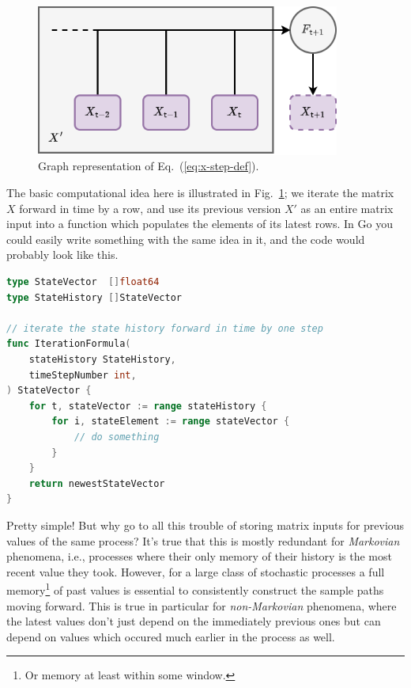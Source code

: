 \documentclass{book}
\begin{document}
\begin{figure}[h]
\centering
\includegraphics[width=10cm]{images/fundamental-loop.drawio.png}
\caption{Graph representation of Eq.~(\ref{eq:x-step-def}).}
\label{fig:fundamental-loop}
\end{figure}

The basic computational idea here is illustrated in Fig.~\ref{fig:fundamental-loop}; we iterate the matrix $X$ forward in time by a row, and use its previous version $X'$ as an entire matrix input into a function which populates the elements of its latest rows. In Go you could easily write something with the same idea in it, and the code would probably look like this.

\begin{lstlisting}[language=Go]
type StateVector  []float64
type StateHistory []StateVector

// iterate the state history forward in time by one step
func IterationFormula(
    stateHistory StateHistory, 
    timeStepNumber int,
) StateVector {
    for t, stateVector := range stateHistory {
        for i, stateElement := range stateVector {
            // do something
        }
    }
    return newestStateVector
}
\end{lstlisting}

Pretty simple! But why go to all this trouble of storing matrix inputs for previous values of the same process? It's true that this is mostly redundant for \emph{Markovian} phenomena, i.e., processes where their only memory of their history is the most recent value they took. However, for a large class of stochastic processes a full memory\footnote{Or memory at least within some window.} of past values is essential to consistently construct the sample paths moving forward. This is true in particular for \emph{non-Markovian} phenomena, where the latest values don't just depend on the immediately previous ones but can depend on values which occured much earlier in the process as well.
\end{document}

